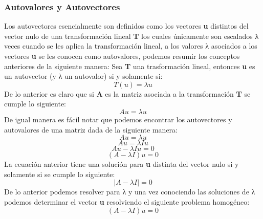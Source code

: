 \documentclass{article}
\begin{document}
\subsubsection{Autovalores y Autovectores}
Los autovectores esencialmente son definidos como los vectores \textbf{u} distintos del vector nulo de una transformación lineal \textbf{T} los cuales únicamente son escalados λ
veces cuando se les aplica la transformación lineal, a los valores λ 
asociados a los vectores \textbf{u} se les conocen como autovalores, podemos resumir los conceptos anteriores de la siguiente manera:
Sea \textbf{T} una trasformación lineal, entonces \textbf{u} es un autovector (y λ un autovalor) si y solamente si:
\[T(u)=\lambda u  \]
De lo anterior es claro que si \textbf{A} es la matriz asociada a la transformación \textbf{T} se cumple lo siguiente:
\[A u=\lambda u  \]
De igual manera es fácil notar que podemos encontrar los autovectores y autovalores de una matriz dada de la siguiente manera:
\[A u=\lambda u  \]
\[A u=\lambda I u  \]
\[A u - \lambda I u=0 \]
\[(A  - \lambda I)u=0 \]
La ecuación anterior tiene una solución para \textbf{u} distinta del vector nulo si y solamente si se cumple lo siguiente:
\[ |A-\lambda I| =0 \]
De lo anterior podemos resolver para λ y una vez conociendo las soluciones de λ podemos determinar el vector \textbf{u} resolviendo el siguiente problema homogéneo:
\[(A  - \lambda I)u=0 \]
\end{document}
